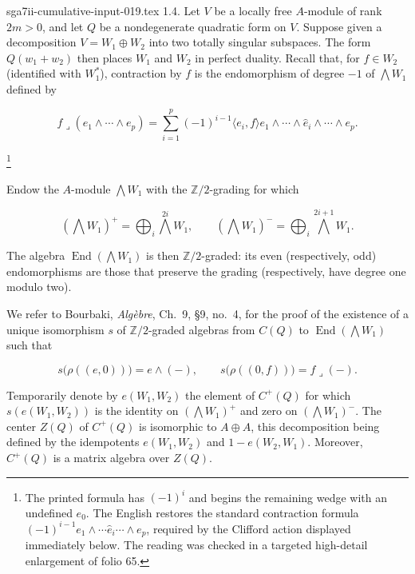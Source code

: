 \begin{filecontents*}{sga7ii-cumulative-input-019.tex}
1.4. Let $V$ be a locally free $A$-module of rank $2m>0$, and let $Q$
be a nondegenerate quadratic form on $V$.  Suppose given a decomposition
$V=W_1\oplus W_2$ into two totally singular subspaces.  The form
$Q(w_1+w_2)$ then places $W_1$ and $W_2$ in perfect duality.  Recall that,
for $f\in W_2$ (identified with $W_1^*$), contraction by $f$ is the
endomorphism of degree $-1$ of $\bigwedge W_1$ defined by

\begin{equation*}
f\mathbin{\lrcorner}(e_1\wedge\cdots\wedge e_p)
=\sum_{i=1}^{p}(-1)^{i-1}\langle e_i,f\rangle
e_1\wedge\cdots\wedge\widehat e_i\wedge\cdots\wedge e_p.
\end{equation*}

\footnote{The printed formula has $(-1)^i$ and begins the remaining wedge
with an undefined $e_0$.  The English restores the standard contraction
formula $(-1)^{i-1}e_1\wedge\cdots\widehat e_i\cdots\wedge e_p$, required
by the Clifford action displayed immediately below.  The reading was
checked in a targeted high-detail enlargement of folio 65.}

Endow the $A$-module $\bigwedge W_1$ with the $\mathbb Z/2$-grading for
which


\begin{equation*}
(\bigwedge W_1)^+=\bigoplus_i\bigwedge^{2i}W_1,
\qquad
(\bigwedge W_1)^-=\bigoplus_i\bigwedge^{2i+1}W_1.
\end{equation*}

The algebra $\operatorname{End}(\bigwedge W_1)$ is then
$\mathbb Z/2$-graded: its even (respectively, odd) endomorphisms are those
that preserve the grading (respectively, have degree one modulo two).

We refer to Bourbaki, \emph{Algèbre}, Ch.~9, \S9, no.~4, for the proof of
the existence of a unique isomorphism $s$ of $\mathbb Z/2$-graded algebras
from $C(Q)$ to $\operatorname{End}(\bigwedge W_1)$ such that

\begin{equation*}
s\bigl(\rho((e,0))\bigr)=e\wedge(-),
\qquad
s\bigl(\rho((0,f))\bigr)=f\mathbin{\lrcorner}(-).
\end{equation*}

Temporarily denote by $e(W_1,W_2)$ the element of $C^+(Q)$ for which
$s(e(W_1,W_2))$ is the identity on $(\bigwedge W_1)^+$ and zero on
$(\bigwedge W_1)^-$.  The center $Z(Q)$ of $C^+(Q)$ is isomorphic to
$A\oplus A$, this decomposition being defined by the idempotents
$e(W_1,W_2)$ and $1-e(W_2,W_1)$.  Moreover, $C^+(Q)$ is a matrix algebra
over $Z(Q)$.


\end{filecontents*}
